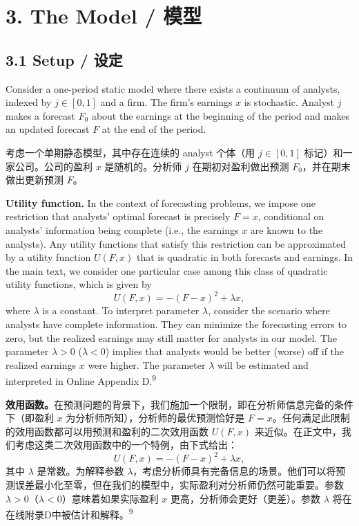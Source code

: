 \documentclass[12pt,a4paper]{article}
\newenvironment{original}
  {\par\medskip\noindent\ignorespaces}
  {\par\medskip}
\newenvironment{translation}
  {\par\noindent{\color{transblue}\ignorespaces}}
  {\par\bigskip}
\begin{document}
\newpage
\section{3. The Model / 模型}

\subsection{3.1 Setup / 设定}

\begin{original}
Consider a one-period static model where there exists a continuum of analysts, indexed by $j \in [0,1]$ and a firm. The firm's earnings $x$ is stochastic. Analyst $j$ makes a forecast $F_0$ about the earnings at the beginning of the period and makes an updated forecast $F$ at the end of the period.
\end{original}
\begin{translation}
考虑一个单期静态模型，其中存在连续的 analyst 个体（用 $j \in [0,1]$ 标记）和一家公司。公司的盈利 $x$ 是随机的。分析师 $j$ 在期初对盈利做出预测 $F_0$，并在期末做出更新预测 $F$。
\end{translation}

\begin{original}
\textbf{Utility function.} In the context of forecasting problems, we impose one restriction that analysts' optimal forecast is precisely $F = x$, conditional on analysts' information being complete (i.e., the earnings $x$ are known to the analysts). Any utility functions that satisfy this restriction can be approximated by a utility function $U(F,x)$ that is quadratic in both forecasts and earnings. In the main text, we consider one particular case among this class of quadratic utility functions, which is given by
\[
U(F,x) = -(F-x)^2 + \lambda x, \tag{3}
\]
where $\lambda$ is a constant. To interpret parameter $\lambda$, consider the scenario where analysts have complete information. They can minimize the forecasting errors to zero, but the realized earnings may still matter for analysts in our model. The parameter $\lambda > 0$ ($\lambda < 0$) implies that analysts would be better (worse) off if the realized earnings $x$ were higher. The parameter $\lambda$ will be estimated and interpreted in Online Appendix D.\textsuperscript{9}
\end{original}
\begin{translation}
\textbf{效用函数。}在预测问题的背景下，我们施加一个限制，即在分析师信息完备的条件下（即盈利 $x$ 为分析师所知），分析师的最优预测恰好是 $F = x$。任何满足此限制的效用函数都可以用预测和盈利的二次效用函数 $U(F,x)$ 来近似。在正文中，我们考虑这类二次效用函数中的一个特例，由下式给出：
\[
U(F,x) = -(F-x)^2 + \lambda x, \tag{3}
\]
其中 $\lambda$ 是常数。为解释参数 $\lambda$，考虑分析师具有完备信息的场景。他们可以将预测误差最小化至零，但在我们的模型中，实际盈利对分析师仍然可能重要。参数 $\lambda > 0$（$\lambda < 0$）意味着如果实际盈利 $x$ 更高，分析师会更好（更差）。参数 $\lambda$ 将在在线附录D中被估计和解释。\textsuperscript{9}
\end{translation}
\end{document}
